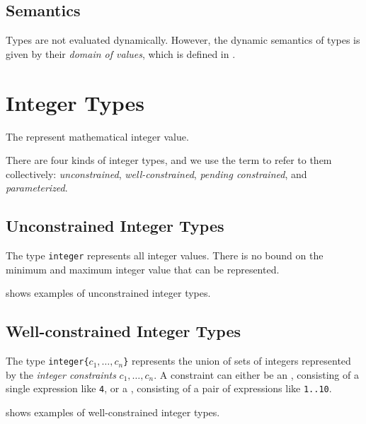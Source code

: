 \subsection{Semantics}
Types are not evaluated dynamically.
However, the dynamic semantics of types is given by their \emph{domain of values},
which is defined in .

\hypertarget{integertypeterm}{}
\section{Integer Types\label{sec:IntegerTypes}}
The \emph{\integertypesterm{}} represent mathematical integer value.

There are four kinds of integer types, and we
use the term \integertypeterm{} to refer to them collectively:
\emph{unconstrained}, \emph{well-constrained},
\emph{pending constrained}, and \emph{parameterized}.

\subsection{Unconstrained Integer Types}
The type \verb|integer| represents all integer values.
%
There is no bound on the minimum and maximum integer value that can be represented.

 shows examples of unconstrained integer types.

\subsection{Well-constrained Integer Types}
%
The type \texttt{integer\{$c_1,\ldots,c_n$\}} represents the
union of sets of integers represented by the \emph{integer constraints} $c_1,\ldots,c_n$.
\hypertarget{def-exactconstraintterm}{}
\hypertarget{def-rangeconstraintterm}{}
A constraint can either be an \emph{\exactconstraintterm}, consisting of a single expression like \texttt{4},
or a \emph{\rangeconstraintterm}, consisting of a pair of expressions like \texttt{1..10}.

 shows examples of well-constrained integer types.

